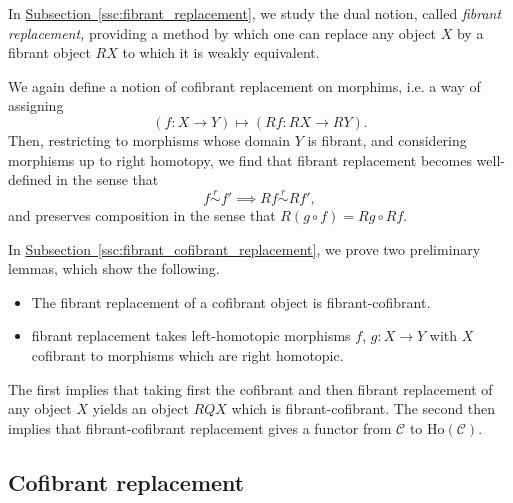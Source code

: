 \documentclass[main.tex]{subfiles}
\begin{document}
In \hyperref[ssc:fibrant_replacement]{Subsection~\ref*{ssc:fibrant_replacement}}, we study the dual notion, called \emph{fibrant replacement,} providing a method by which one can replace any object $X$ by a fibrant object $RX$ to which it is weakly equivalent.

We again define a notion of cofibrant replacement on morphims, i.e. a way of assigning
\begin{equation*}
  (f\colon X \to Y) \mapsto (Rf\colon RX \to RY).
\end{equation*}
Then, restricting to morphisms whose domain $Y$ is fibrant, and considering morphisms up to right homotopy, we find that fibrant replacement becomes well-defined in the sense that
\begin{equation*}
  f \overset{r}{\sim} f' \implies Rf \overset{r}{\sim} Rf',
\end{equation*}
and preserves composition in the sense that $R(g \circ f) = Rg \circ Rf$.

In \hyperref[ssc:fibrant_cofibrant_replacement]{Subsection~\ref*{ssc:fibrant_cofibrant_replacement}}, we prove two preliminary lemmas, which show the following.
\begin{itemize}
  \item The fibrant replacement of a cofibrant object is fibrant-cofibrant.

  \item fibrant replacement takes left-homotopic morphisms $f$, $g\colon X \to Y$ with $X$ cofibrant to morphisms which are right homotopic.
\end{itemize}
The first implies that taking first the cofibrant and then fibrant replacement of any object $X$ yields an object $RQX$ which is fibrant-cofibrant. The second then implies that fibrant-cofibrant replacement gives a functor from $\mathcal{C}$ to $\mathrm{Ho}(\mathcal{C})$.

\subsection{Cofibrant replacement}
\label{ssc:cofibrant_replacement}
\end{document}
